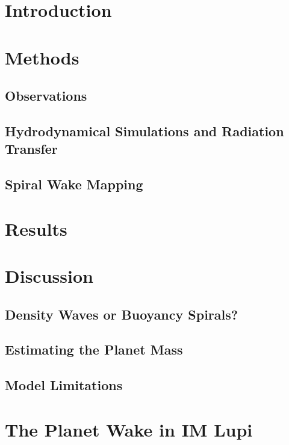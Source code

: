 
\section{Introduction}

\section{Methods}

\subsection{Observations}

\subsection{Hydrodynamical Simulations and Radiation Transfer}

\subsection{Spiral Wake Mapping}

\section{Results}

\section{Discussion}

\subsection{Density Waves or Buoyancy Spirals?}

\subsection{Estimating the Planet Mass}

\subsection{Model Limitations}

\section{The Planet Wake in IM Lupi} \label{sec:IMLupiwake}